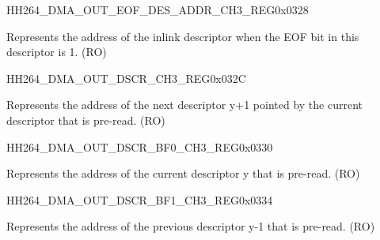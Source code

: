     
    \begin{register}{H}{H264\_DMA\_OUT\_EOF\_DES\_ADDR\_CH3\_REG}{0x0328}\label{regdesc:H264DMAOUTEOFDESADDRCH3REG}
    \regnewline%
    \begin{regdesc}\begin{reglist}
    \label{fielddesc:H264DMAOUTEOFDESADDRCH3}\item [H264\_DMA\_OUT\_EOF\_DES\_ADDR\_CH3] Represents the address of the inlink descriptor when the EOF bit in this descriptor is 1. (RO)
    \end{reglist}\end{regdesc}
    \end{register}
    
    
    \begin{register}{H}{H264\_DMA\_OUT\_DSCR\_CH3\_REG}{0x032C}\label{regdesc:H264DMAOUTDSCRCH3REG}
    \regnewline%
    \begin{regdesc}\begin{reglist}
    \label{fielddesc:H264DMAOUTLINKDSCRCH3}\item [H264\_DMA\_OUTLINK\_DSCR\_CH3] Represents the address of the next descriptor y+1 pointed by the current descriptor that is pre-read. (RO)
    \end{reglist}\end{regdesc}
    \end{register}
    
    
    \begin{register}{H}{H264\_DMA\_OUT\_DSCR\_BF0\_CH3\_REG}{0x0330}\label{regdesc:H264DMAOUTDSCRBF0CH3REG}
    \regnewline%
    \begin{regdesc}\begin{reglist}
    \label{fielddesc:H264DMAOUTLINKDSCRBF0CH3}\item [H264\_DMA\_OUTLINK\_DSCR\_BF0\_CH3] Represents the address of the current descriptor y that is pre-read. (RO)
    \end{reglist}\end{regdesc}
    \end{register}
    
    
    \begin{register}{H}{H264\_DMA\_OUT\_DSCR\_BF1\_CH3\_REG}{0x0334}\label{regdesc:H264DMAOUTDSCRBF1CH3REG}
    \regnewline%
    \begin{regdesc}\begin{reglist}
    \label{fielddesc:H264DMAOUTLINKDSCRBF1CH3}\item [H264\_DMA\_OUTLINK\_DSCR\_BF1\_CH3] Represents the address of the previous descriptor y-1 that is pre-read. (RO)
    \end{reglist}\end{regdesc}
    \end{register}
    
